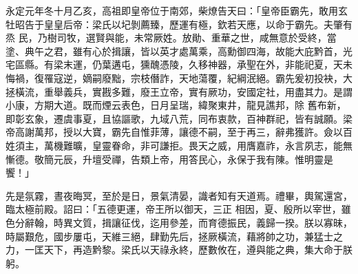 
\begin{pinyinscope}

 永定元年冬十月乙亥，高祖即皇帝位于南郊，柴燎告天曰：「皇帝臣霸先，敢用玄牡昭告于皇皇后帝：梁氏以圮剝薦臻，歷運有極，欽若天應，以命于霸先。夫肇有烝
 民，乃樹司牧，選賢與能，未常厥姓。放勛、重華之世，咸無意於受終，當塗、典午之君，雖有心於揖讓，皆以英才處萬乘，高勳御四海，故能大庇黔首，光宅區縣。有梁末運，仍葉遘屯，獯醜憑陵，久移神器，承聖在外，非能祀夏，天未悔禍，復罹寇逆，嫡嗣廢黜，宗枝僭詐，天地蕩覆，紀綱泯絕。霸先爰初投袂，大拯橫流，重舉義兵，實戡多難，廢王立帝，實有厥功，安國定社，用盡其力。是謂小康，方期大道。既而煙云表色，日月呈瑞，緯聚東井，龍見譙邦，除
 舊布新，即彰玄象，遷虞事夏，且協謳歌，九域八荒，同布衷款，百神群祀，皆有誠願。梁帝高謝萬邦，授以大寶，霸先自惟菲薄，讓德不嗣，至于再三，辭弗獲許。僉以百姓須主，萬機難曠，皇靈眷命，非可謙拒。畏天之威，用膺嘉祚，永言夙志，能無慚德。敬簡元辰，升壇受禪，告類上帝，用答民心，永保于我有陳。惟明靈是饗！」



 先是氛霧，晝夜晦冥，至於是日，景氣清晏，識者知有天道焉。禮畢，輿駕還宮，臨太極前殿。詔曰：「五德更運，帝王所以御天，三正
 相因，夏、殷所以宰世，雖色分辭翰，時異文質，揖讓征伐，迄用參差，而育德振民，義歸一揆。朕以寡昧，時屬艱危，國步屢屯，天維三絕，肆勤先后，拯厥橫流，藉將帥之功，兼猛士之力，一匡天下，再造黔黎。梁氏以天祿永終，歷數攸在，遵與能之典，集大命于朕躬。




\end{pinyinscope}
